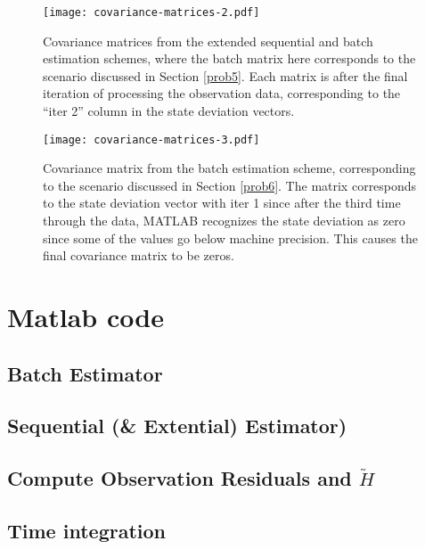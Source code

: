 \documentclass[a4paper,11pt]{article}
\begin{document}
	\begin{figure}
	\centering
	\texttt{[image: covariance-matrices-2.pdf]}
	\caption{Covariance matrices from the extended sequential and batch estimation schemes, where the batch matrix here corresponds to the scenario discussed in Section \ref{prob5}. Each matrix is after the final iteration of processing the observation data, corresponding to the ``iter 2'' column in the state deviation vectors.} 
	\label{fig:covariance2}
	\end{figure}
	
	\begin{figure}
	\centering
	\texttt{[image: covariance-matrices-3.pdf]}
	\caption{Covariance matrix from the batch estimation scheme, corresponding to the scenario discussed in Section \ref{prob6}. The matrix corresponds to the state deviation vector with iter 1 since after the third time through the data, MATLAB recognizes the state deviation as zero since some of the values go below machine precision. This causes the final covariance matrix to be zeros.} 
	\label{fig:covariance3}
	\end{figure}
	
	\newpage
	\section{Matlab code}
	
	 \subsection{Batch Estimator}
	 
	 
	 \subsection{Sequential (\& Extential) Estimator)}
	 
	 
	 \subsection{Compute Observation Residuals and $\tilde{H}$}
	 
	 
	 \subsection{Time integration}
	 
	 
\end{document}
